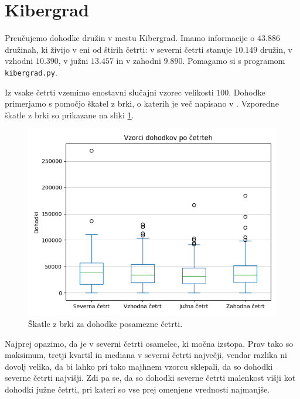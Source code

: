 \documentclass[12pt, a4paper]{article}
\begin{document}
\author{Jan Pantner \\
\small Profesor: doc.~dr.~Martin~Raič}
\date{September 2024}
\maketitle
\thispagestyle{empty}

\newpage

\tableofcontents
\newpage

\section{Kibergrad}

Preučujemo dohodke družin v mestu Kibergrad. Imamo informacije o $43.886$ družinah, 
ki živijo v eni od štirih četrti: v severni četrti stanuje $10.149$ družin, v
vzhodni $10.390$, v južni $13.457$ in v zahodni $9.890$. Pomagamo si 
s programom \texttt{kibergrad.py}.

Iz vsake četrti vzemimo enostavni slučajni vzorec velikosti $100$. 
Dohodke primerjamo s pomočjo škatel z brki, o katerih je več 
napisano v \cite[Poglavje~10.6]{rice2007mathematical}.
Vzporedne škatle z brki so prikazane na sliki \ref{img:cetrti}.
\begin{figure}[H]
    \centering
    \includegraphics[width=12cm]{Slike/vse_cetrti.png}
    \caption{Škatle z brki za dohodke posamezne četrti.}
    \label{img:cetrti}
\end{figure}
Najprej opazimo, da je v severni četrti osamelec, ki močna izstopa. Prav tako so maksimum, tretji 
kvartil in mediana v severni četrti največji, vendar razlika ni dovolj velika, 
da bi lahko pri tako majhnem vzorcu sklepali, da so dohodki severne četrti 
najvišji. Zdi pa se, da so dohodki severne četrti malenkost višji kot dohodki 
južne četrti, pri kateri so vse prej omenjene vrednosti najmanjše. 
\end{document}
